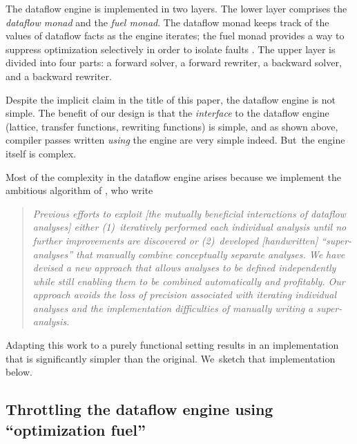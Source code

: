 
The dataflow engine is implemented in two layers.
The lower layer comprises the \emph{dataflow monad} and the \emph{fuel monad}.
The dataflow monad keeps track of the values of dataflow facts as the
engine iterates; the fuel monad provides a way to suppress
optimization selectively in order to isolate faults \cite{whalley:isolation}.
%
The upper layer is divided into four parts:
a forward solver, a forward rewriter,
a backward solver, and a backward rewriter.

Despite the implicit claim in the title of this paper,
the dataflow engine is not simple.
The benefit of our design is that the \emph{interface} to the dataflow
engine (lattice, transfer functions, rewriting functions) is simple,
and as shown above, compiler passes written \emph{using} the engine
are very simple indeed.
But~the engine itself is complex.

Most of the complexity in the dataflow engine arises because we
implement the ambitious algorithm of
\citet{lerner-grove-chambers:2002}, who write
\begin{quote}
\emph{Previous efforts to exploit [the mutually beneficial
interactions of dataflow analyses] either (1)~iteratively performed
each individual analysis until no further improvements are discovered
or (2)~developed [handwritten] ``super-analyses'' that manually
combine conceptually separate analyses. We have devised a new approach
that allows analyses to be defined independently while still enabling
them to be combined automatically and profitably. Our approach avoids
the loss of precision associated with iterating individual analyses
and the implementation difficulties of manually writing a
super-analysis.}
\end{quote}
Adapting this work to a purely functional setting results in an
implementation that is significantly simpler than the original.
We~sketch that implementation below.



\subsection{Throttling the dataflow engine using ``optimization
  fuel''}

